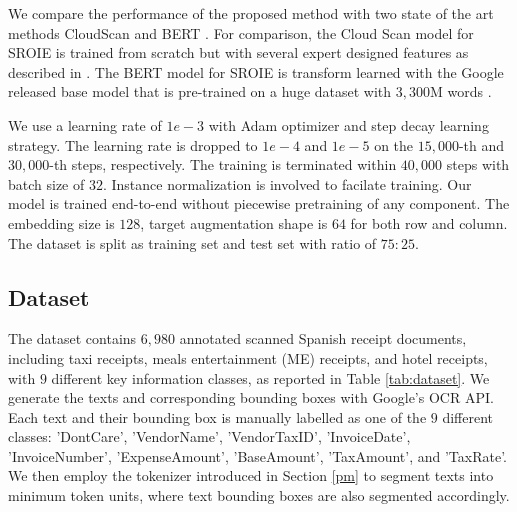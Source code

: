 \documentclass[10pt,twocolumn,letterpaper]{article}
\begin{document}
We compare the performance of the proposed method with two state of the art methods CloudScan \cite{cloudscan} and BERT \cite{bert}. For comparison, the Cloud Scan model for SROIE is trained from scratch but with several expert designed features as described in \cite{cloudscan}. The BERT model for SROIE is transform learned with the Google released base model that is pre-trained on a huge dataset with $3,300$M words \cite{bert,bertgit}.

We use a learning rate of $1e-3$ with Adam optimizer and step decay learning strategy. The learning rate is dropped to $1e-4$ and $1e-5$ on the $15,000$-th and $30,000$-th steps, respectively. The training is terminated within $40,000$ steps with batch size of $32$. Instance normalization is involved to facilate training. Our model is trained end-to-end without piecewise pretraining of any component. The embedding size is $128$, target augmentation shape is $64$ for both row and column. The dataset is split as training set and test set with ratio of $75:25$.

\subsection{Dataset}
The dataset contains $6,980$ annotated scanned Spanish receipt documents, including taxi receipts, meals entertainment (ME) receipts, and hotel receipts, with $9$ different key information classes, as reported in Table \ref{tab:dataset}. We generate the texts and corresponding bounding boxes with Google's OCR API. Each text and their bounding box is manually labelled as one of the $9$ different classes: 'DontCare', 'VendorName', 'VendorTaxID', 'InvoiceDate', 'InvoiceNumber', 'ExpenseAmount', 'BaseAmount', 'TaxAmount', and 'TaxRate'. We then employ the tokenizer introduced in Section \ref{pm} to segment texts into minimum token units, where text bounding boxes are also segmented accordingly. 
\end{document}
